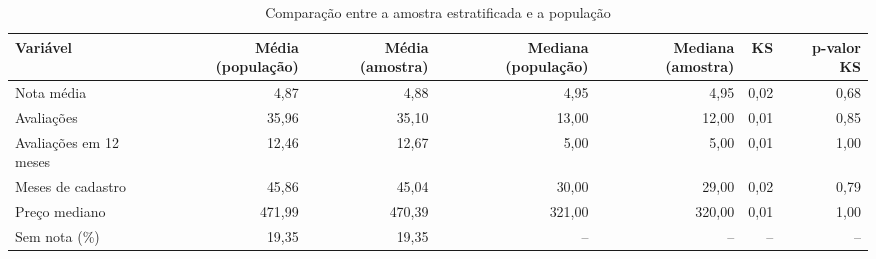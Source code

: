 \begin{table}[ht]
\centering
\caption{Comparação entre a amostra estratificada e a população}
\label{tab:comparacao_amostra}
\begin{tabular}{lrrrrrr}
\hline
\textbf{Variável} & \textbf{Média (população)} & \textbf{Média (amostra)} & \textbf{Mediana (população)} & \textbf{Mediana (amostra)} & \textbf{KS} & \textbf{p-valor KS} \\
\hline
Nota média & 4,87 & 4,88 & 4,95 & 4,95 & 0,02 & 0,68 \\
Avaliações & 35,96 & 35,10 & 13,00 & 12,00 & 0,01 & 0,85 \\
Avaliações em 12 meses & 12,46 & 12,67 & 5,00 & 5,00 & 0,01 & 1,00 \\
Meses de cadastro & 45,86 & 45,04 & 30,00 & 29,00 & 0,02 & 0,79 \\
Preço mediano & 471,99 & 470,39 & 321,00 & 320,00 & 0,01 & 1,00 \\
Sem nota (\%) & 19,35 & 19,35 & -- & -- & -- & -- \\
\hline
\end{tabular}
\end{table}
